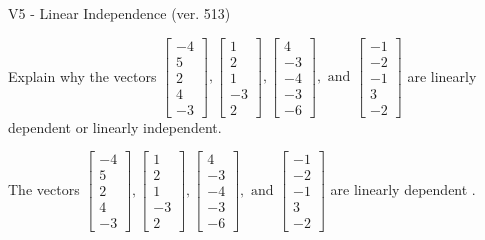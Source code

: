 \begin{exercise}
  \begin{exerciseTitle}V5 - Linear Independence (ver. 513)\end{exerciseTitle}
  \begin{exerciseStatement}
    Explain why the vectors \(\left[\begin{array}{r}
-4 \\
5 \\
2 \\
4 \\
-3
\end{array}\right] , \left[\begin{array}{r}
1 \\
2 \\
1 \\
-3 \\
2
\end{array}\right] , \left[\begin{array}{r}
4 \\
-3 \\
-4 \\
-3 \\
-6
\end{array}\right] , \text{ and } \left[\begin{array}{r}
-1 \\
-2 \\
-1 \\
3 \\
-2
\end{array}\right]\) are linearly dependent or linearly independent.	


  \end{exerciseStatement}
  \begin{exerciseAnswer}
   The vectors \(\left[\begin{array}{r}
-4 \\
5 \\
2 \\
4 \\
-3
\end{array}\right] , \left[\begin{array}{r}
1 \\
2 \\
1 \\
-3 \\
2
\end{array}\right] , \left[\begin{array}{r}
4 \\
-3 \\
-4 \\
-3 \\
-6
\end{array}\right] , \text{ and } \left[\begin{array}{r}
-1 \\
-2 \\
-1 \\
3 \\
-2
\end{array}\right]\) are 
  	 linearly dependent  .
  


  \end{exerciseAnswer}
\end{exercise}